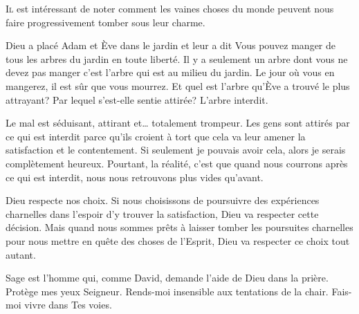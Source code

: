 





\lettrine{I}{l} est intéressant de noter comment les vaines choses
 du monde peuvent nous faire progressivement tomber sous leur charme.

Dieu a placé Adam et Ève dans le jardin et leur a dit\frcolon{}
 \Og Vous pouvez manger de tous les arbres du jardin en toute liberté.
 Il y a seulement un arbre dont vous ne devez pas manger\frcolon{} c'est l'arbre
 qui est au milieu du jardin. Le jour où vous en mangerez,
 il est sûr que vous mourrez. \Fg{}
 Et quel est l'arbre qu'Ève a trouvé le plus attrayant?
 Par lequel s'est-elle sentie attirée? L'arbre interdit.

Le mal est séduisant, attirant et\dots{} totalement trompeur.
 Les gens sont attirés par ce qui est interdit parce qu'ils croient
 à tort que cela va leur amener la satisfaction et le contentement.
 \Og Si seulement je pouvais avoir cela,
 alors je serais complètement heureux. \Fg{}
 Pourtant, la réalité, c'est que quand nous courrons après ce qui est interdit,
 nous nous retrouvons plus vides qu'avant.


Dieu respecte nos choix. Si nous choisissons de poursuivre des expériences
 charnelles dans l'espoir d'y trouver la satisfaction,
 Dieu va respecter cette décision.
 Mais quand nous sommes prêts à laisser tomber les poursuites charnelles
 pour nous mettre en quête des choses de l'Esprit,
 Dieu va respecter ce choix tout autant.

Sage est l'homme qui, comme David, demande l'aide de Dieu dans la prière.
 \Og Protège mes yeux Seigneur.
 Rends-moi insensible aux tentations de la chair.
 Fais-moi vivre dans Tes voies. \Fg{}

\dvrule



